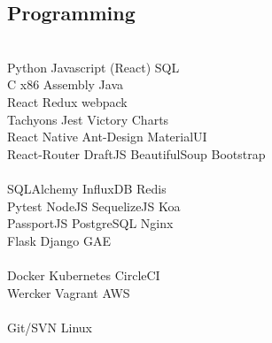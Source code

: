\documentclass[]{deedy-resume-openfont}
\begin{document}
\begin{minipage}[t]{0.31\textwidth}
\subsection{Programming}
\\[1\baselineskip]

Python \textbullet{} Javascript (React) \textbullet{}  SQL
\\[1\baselineskip]

 C \textbullet{} x86 Assembly \textbullet{} Java
\\[1\baselineskip]

React \textbullet{} Redux \textbullet{} webpack \\
Tachyons \textbullet{} Jest \textbullet{} Victory Charts \\
React Native \textbullet{} Ant-Design \textbullet{} MaterialUI \\
React-Router \textbullet{} DraftJS \textbullet{}
BeautifulSoup \textbullet{} Bootstrap \\
\\[1\baselineskip]


SQLAlchemy \textbullet{} InfluxDB \textbullet{} Redis \\
Pytest \textbullet{} NodeJS \textbullet{} SequelizeJS \textbullet{} Koa \\
PassportJS \textbullet{} PostgreSQL \textbullet{} Nginx \\
Flask \textbullet{} Django \textbullet{} GAE \\
\\[1\baselineskip]



Docker \textbullet{} Kubernetes \textbullet{} CircleCI \\
Wercker \textbullet{} Vagrant \textbullet{} AWS \\
\\[1\baselineskip]

Git/SVN \textbullet{} Linux \\
\\[1\baselineskip]

\sectionsep



\end{minipage}
\end{document}
